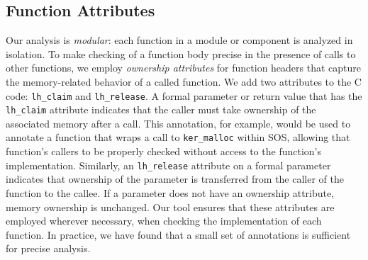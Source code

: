 \subsection{Function Attributes}

Our analysis is {\em modular}:  each function in a module or component
is analyzed in isolation.  To make checking of a function body precise
in the presence of calls to other functions, we employ {\em ownership
attributes} for function headers that capture the memory-related
behavior of a called function.  We add two attributes to the C code:
{\tt lh\_claim} and {\tt lh\_release}.  A formal parameter or return
value that has the {\tt lh\_claim} attribute indicates that the caller
must take ownership of the associated memory after a call.  This
annotation, for example, would be used to annotate a function that
wraps a call to {\tt ker\_malloc} within SOS, allowing that function's
callers to be properly checked without access to the function's
implementation.  Similarly, an {\tt lh\_release} attribute on a formal
parameter indicates that ownership of the parameter is transferred
from the caller of the function to the callee.  If a parameter does
not have an ownership attribute, memory ownership is unchanged.  Our
tool ensures that these attributes are employed wherever necessary,
when checking the implementation of each function.  In practice, we
have found that a small set of annotations is sufficient for precise
analysis.


